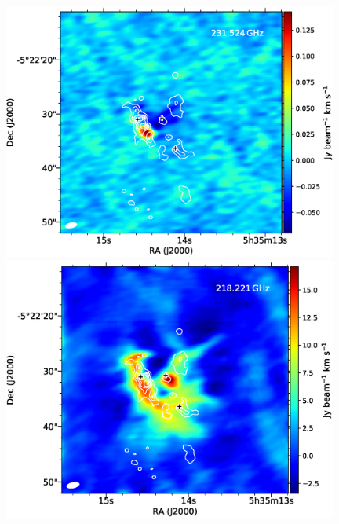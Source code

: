 \newpage

\begin{figure}[H] 
\begin{center}

\begin{minipage}{0.98\textwidth} 
\begin{center}
\begin{minipage}{0.48\textwidth}
\begin{center}
\includegraphics[width=0.98\textwidth]{OrionKL/mom0/231.524mom0_3-7.eps}
\end{center}
\end{minipage}
\begin{minipage}{0.48\textwidth}
\begin{center}
\includegraphics[width=0.98\textwidth]{OrionKL/mom0/218.221mom0_3-7.eps}
\end{center}
\end{minipage}
\end{center}
\end{minipage}


\end{center}
\end{figure}
